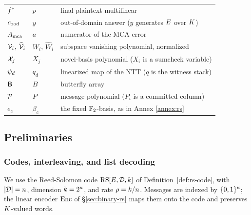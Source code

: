 \begin{center}
\begin{tabular}{@{}lll@{}}
$f^{\ast}$      & $p$          & final plaintext multilinear\\
$c_{\mathrm{ood}}$        & $y$          & out-of-domain answer ($y$ generates $E$ over $K$)\\
$A_{\mathrm{mca}}$      & $a$          & numerator of the MCA error\\
$\mathcal{V}_i$, $\widehat{\mathcal{V}}_{i}$ & $W_i$, $\widehat W_i$ & subspace vanishing polynomial, normalized\\
$\mathcal{X}_j$     & $X_j$        & novel-basis polynomial ($X_i$ is a sumcheck variable)\\
$\psi_d$     & $q_d$        & linearized map of the NTT ($q$ is the witness stack)\\
$\mathsf{B}$       & $B$          & butterfly array\\
$\mathcal{P}$       & $P$          & message polynomial ($P_i$ is a committed column)\\
$e_c$          & $\beta_c$    & the fixed $\mathbb{F}_2$-basis, as in Annex \ref{annex:rs}\\
\hline
\end{tabular}
\end{center}

\subsection{Preliminaries}\label{sec:prelims}

\subsubsection{Codes, interleaving, and list decoding}\label{sec:codes}

We use the Reed-Solomon code $\mathrm{RS}[E,\mathcal{D},k]$ of Definition~\ref{def:rs-code}, with $|\mathcal{D}|=n$, dimension $k=2^\kappa$, and rate $\rho=k/n$. Messages are indexed by $\{0,1\}^{\kappa}$; the linear encoder $\mathrm{Enc}$ of \S\ref{sec:binary-rs} maps them onto the code and preserves $K$-valued words.

